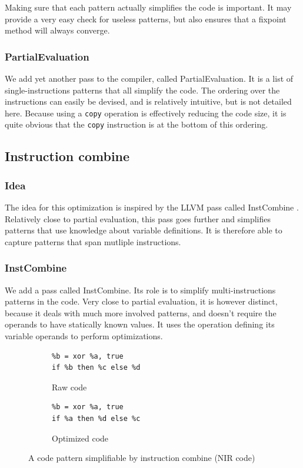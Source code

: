 \documentclass[12pt,a4paper]{article}
\newcommand{\scala}[1]{\textsf{#1}}
\newcommand{\nir}[1]{\texttt{#1}}
\begin{document}
Making sure that each pattern actually simplifies the code is important. It may provide a  very easy check for useless patterns, but also ensures that a fixpoint method will always converge.

\subsubsection*{PartialEvaluation}

We add yet another pass to the compiler, called \scala{PartialEvaluation}. It is a list of single-instructions patterns that all simplify the code. The ordering over the instructions can easily be devised, and is relatively intuitive, but is not detailed here. Because using a \nir{copy} operation is effectively reducing the code size, it is quite obvious that the \nir{copy} instruction is at the bottom of this ordering.

\subsection{Instruction combine}

\subsubsection*{Idea}

The idea for this optimization is inspired by the LLVM pass called \scala{InstCombine} \cite{llvmpasses}. Relatively close to partial evaluation, this pass goes further and simplifies patterns that use knowledge about variable definitions. It is therefore able to capture patterns that span mutliple instructions.

\subsubsection*{InstCombine}

We add a pass called \scala{InstCombine}. Its role is to simplify multi-instructions patterns in the code. Very close to partial evaluation, it is however distinct, because it deals with much more involved patterns, and doesn't require the operands to have statically known values. It uses the operation defining its variable operands to perform optimizations.

\begin{figure}
	\begin{subfigure}{0.5\textwidth}
		\begin{lstlisting}[style=nirsnp]
%a = ...
%b = xor %a, true
if %b then %c else %d
		\end{lstlisting}
		\caption{Raw code}
	\end{subfigure}
	\quad
	\begin{subfigure}{0.5\textwidth}
		\begin{lstlisting}[style=nirsnp]
%a = ...
%b = xor %a, true
if %a then %d else %c
		\end{lstlisting}
		\caption{Optimized code}
	\end{subfigure}
	\caption{A code pattern simplifiable by instruction combine (NIR code)}
	\label{fig:ic}
\end{figure}
\end{document}
